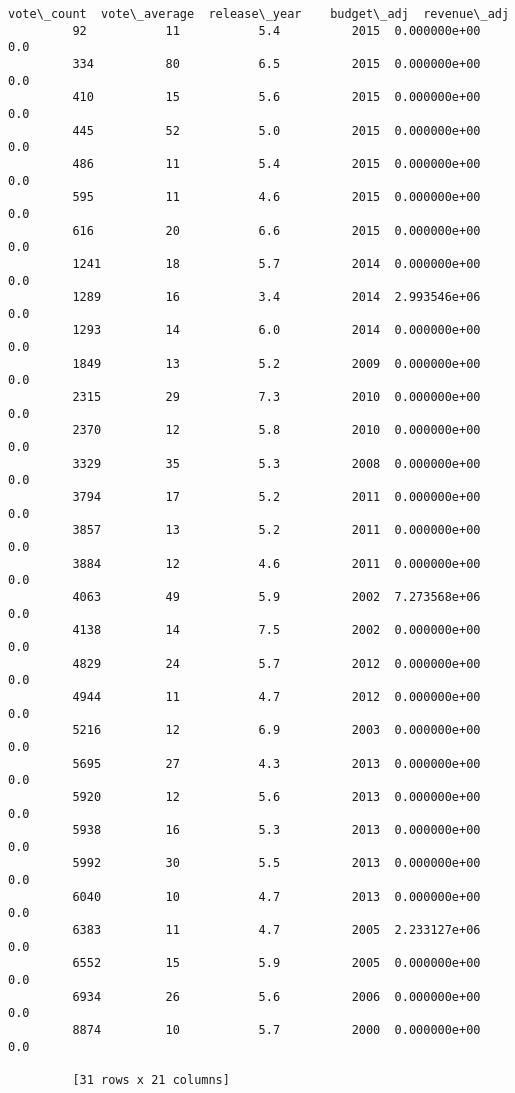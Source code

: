 \documentclass[11pt]{article}
\begin{document}
\begin{Verbatim}[commandchars=\\\{\}]
              vote\_count  vote\_average  release\_year    budget\_adj  revenue\_adj  
         92           11           5.4          2015  0.000000e+00          0.0  
         334          80           6.5          2015  0.000000e+00          0.0  
         410          15           5.6          2015  0.000000e+00          0.0  
         445          52           5.0          2015  0.000000e+00          0.0  
         486          11           5.4          2015  0.000000e+00          0.0  
         595          11           4.6          2015  0.000000e+00          0.0  
         616          20           6.6          2015  0.000000e+00          0.0  
         1241         18           5.7          2014  0.000000e+00          0.0  
         1289         16           3.4          2014  2.993546e+06          0.0  
         1293         14           6.0          2014  0.000000e+00          0.0  
         1849         13           5.2          2009  0.000000e+00          0.0  
         2315         29           7.3          2010  0.000000e+00          0.0  
         2370         12           5.8          2010  0.000000e+00          0.0  
         3329         35           5.3          2008  0.000000e+00          0.0  
         3794         17           5.2          2011  0.000000e+00          0.0  
         3857         13           5.2          2011  0.000000e+00          0.0  
         3884         12           4.6          2011  0.000000e+00          0.0  
         4063         49           5.9          2002  7.273568e+06          0.0  
         4138         14           7.5          2002  0.000000e+00          0.0  
         4829         24           5.7          2012  0.000000e+00          0.0  
         4944         11           4.7          2012  0.000000e+00          0.0  
         5216         12           6.9          2003  0.000000e+00          0.0  
         5695         27           4.3          2013  0.000000e+00          0.0  
         5920         12           5.6          2013  0.000000e+00          0.0  
         5938         16           5.3          2013  0.000000e+00          0.0  
         5992         30           5.5          2013  0.000000e+00          0.0  
         6040         10           4.7          2013  0.000000e+00          0.0  
         6383         11           4.7          2005  2.233127e+06          0.0  
         6552         15           5.9          2005  0.000000e+00          0.0  
         6934         26           5.6          2006  0.000000e+00          0.0  
         8874         10           5.7          2000  0.000000e+00          0.0  
         
         [31 rows x 21 columns]
\end{Verbatim}
            
\end{document}
